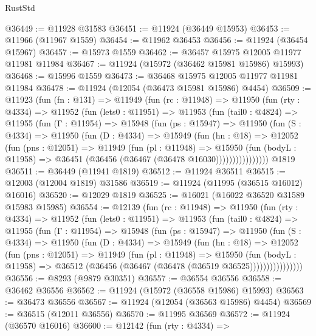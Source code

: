 \begin{lexlean}{RustStd}
\begin{coremodule}
{\begin{coremodule}
{{{{{{{{{{{{{{{{{{{{{{{{{{{{{{{{{{{{{{{{{{{{{{{{{{{{{{{{{{{{{{{{{{{{{{{{{{{{{{{{@36449 := @11928 @31583
@36451 := @11924 (@36449 @15953)
@36453 := @11966 (@11967 @1559)
@36454 := @11962 @36453
@36456 := @11924 (@36454 @15967)
@36457 := @15973 @1559
@36462 := @36457 @15975 @12005 @11977 @11981 @11984
@36467 := @11924 (@15972 (@36462 @15981 @15986) @15993)
@36468 := @15996 @1559
@36473 := @36468 @15975 @12005 @11977 @11981 @11984
@36478 := @11924 (@12054 (@36473 @15981 @15986) @4454)
@36509 := @11923
    (fun (fn : @131) =>
    @11949
      (fun (rc : @11948) =>
      @11950
        (fun (rty : @4334) =>
        @11952
          (fun (lets0 : @11951) =>
          @11953
            (fun (tail0 : @4824) =>
            @11955
              (fun (Γ : @11954) =>
              @15948
                (fun (ps : @15947) =>
                @11950
                  (fun (S : @4334) =>
                  @11950
                    (fun (D : @4334) =>
                    @15949
                      (fun (hn : @18) =>
                      @12052
                        (fun (pns : @12051) =>
                        @11949
                          (fun (pl : @11948) =>
                          @15950
                            (fun (bodyL : @11958) =>
                            @36451 (@36456 (@36467 (@36478 @16030))))))))))))))))
    @1819
@36511 := @36449 (@11941 @1819)
@36512 := @11924 @36511
@36515 := @12003 (@12004 @1819) @31586
@36519 := @11924 (@11995 (@36515 @16012) @16016)
@36520 := @12029 @1819
@36525 := @16021 (@16022 @36520 @31589 @15983 @15985)
@36554 := @12139
    (fun (rc : @11948) =>
    @11950
      (fun (rty : @4334) =>
      @11952
        (fun (lets0 : @11951) =>
        @11953
          (fun (tail0 : @4824) =>
          @11955
            (fun (Γ : @11954) =>
            @15948
              (fun (ps : @15947) =>
              @11950
                (fun (S : @4334) =>
                @11950
                  (fun (D : @4334) =>
                  @15949
                    (fun (hn : @18) =>
                    @12052
                      (fun (pns : @12051) =>
                      @11949
                        (fun (pl : @11948) =>
                        @15950
                          (fun (bodyL : @11958) =>
                          @36512 (@36456 (@36467 (@36478 (@36519 @36525))))))))))))))))
@36556 := @8293 (@9879 @30351)
@36557 := @36554 @36556
@36558 := @36462 @36556
@36562 := @11924 (@15972 (@36558 @15986) @15993)
@36563 := @36473 @36556
@36567 := @11924 (@12054 (@36563 @15986) @4454)
@36569 := @36515 (@12011 @36556)
@36570 := @11995 @36569
@36572 := @11924 (@36570 @16016)
@36600 := @12142
    (fun (rty : @4334) =>
}}}}}}}}}}}}}}}}}}}}}}}}}}}}}}}}}}}}}}}}}}}}}}}}}}}}}}}}}}}}}}}}}}}}}}}}}}}}}}}}
\end{coremodule}}
\end{coremodule}
\end{lexlean}
